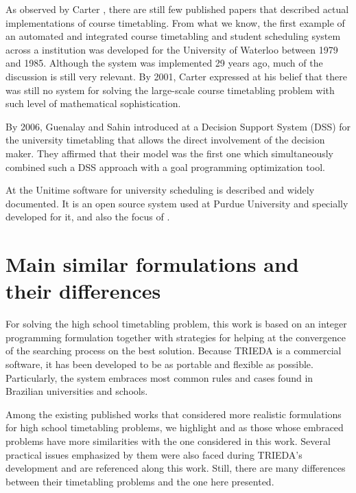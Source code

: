 As observed by Carter \cite{Carter2001}, there are still few published papers that described actual implementations of course timetabling. From what we know, the first example of an automated and integrated course timetabling and student scheduling system across a institution was developed for the University of Waterloo between 1979 and 1985. Although the system was implemented 29 years ago, much of the discussion is still very relevant. By 2001, Carter expressed at \cite{Carter2001} his belief that there was still no system for solving the large-scale course timetabling problem with such level of mathematical sophistication.

By 2006, Guenalay and Sahin introduced at \cite{Guenalay2006} a Decision Support System (DSS) for the university timetabling that allows the direct involvement of the decision maker. They affirmed that their model was the first one which simultaneously combined such a DSS approach with a goal programming optimization tool.

At \cite{Unitime} the Unitime software for university scheduling is described and widely documented. It is an open source system used at Purdue University and specially developed for it, and also the focus of \cite{Murray2007}.


\section{Main similar formulations and their differences}

For solving the high school timetabling problem, this work is based on an integer programming formulation together with strategies for helping at the convergence of the searching process on the best solution. Because TRIEDA is a commercial software, it has been developed to be as portable and flexible as possible. Particularly, the system embraces most common rules and cases found in Brazilian universities and schools.

Among the existing published works that considered more realistic formulations for high school timetabling problems, we highlight \cite{Birbas2009} and \cite{VGAH2012} as those whose embraced problems have more similarities with the one considered in this work. Several practical issues emphasized by them were also faced during TRIEDA's development and are referenced along this work. Still, there are many differences between their timetabling problems and the one here presented. 

